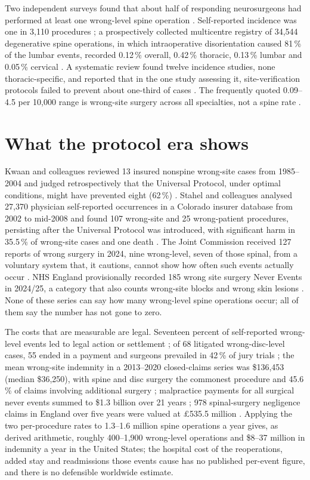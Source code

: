\documentclass[11pt,letterpaper]{article}
\begin{document}
Two independent surveys found that about half of responding neurosurgeons had performed at least one
wrong-level spine operation \citep{mody2008,groff2013}. Self-reported incidence was one in 3,110
procedures \citep{mody2008}; a prospectively collected multicentre registry of 34,544 degenerative spine
operations, in which intraoperative disorientation caused 81\,\% of the lumbar events, recorded 0.12\,\% overall,
0.42\,\% thoracic, 0.13\,\% lumbar and 0.05\,\% cervical \citep{furuya2026}. A systematic review found
twelve incidence studies, none thoracic-specific, and reported that in the one study assessing it,
site-verification protocols failed to prevent about one-third of cases \citep{longo2012}. The
frequently quoted 0.09--4.5 per 10,000 range is wrong-site surgery across all specialties, not a spine
rate \citep{devine2010}.

\section*{What the protocol era shows}
Kwaan and colleagues reviewed 13 insured nonspine wrong-site cases from 1985--2004 and judged
retrospectively that the Universal Protocol, under optimal conditions, might have prevented eight
(62\,\%) \citep{kwaan2006}. Stahel and colleagues
analysed 27,370 physician self-reported occurrences in a Colorado insurer database from 2002 to mid-2008
and found 107 wrong-site and 25 wrong-patient procedures, persisting after the Universal Protocol was
introduced, with significant harm in 35.5\,\% of wrong-site cases and one death \citep{stahel2010}. The Joint Commission received 127 reports of wrong surgery in
2024, nine wrong-level, seven of those spinal, from a voluntary system that, it cautions, cannot show
how often such events actually occur \citep{jc2024}. NHS England provisionally recorded 185 wrong site surgery Never Events in
2024/25, a category that also counts wrong-site blocks and wrong skin lesions \citep{nhse2025}. None of these series can say how many wrong-level spine operations occur; all of them
say the number has not gone to zero.

The costs that are measurable are legal. Seventeen percent of self-reported wrong-level events led to
legal action or settlement \citep{mody2008}; of 68 litigated wrong-disc-level cases, 55 ended in a
payment and surgeons prevailed in 42\,\% of jury trials \citep{goodkin2004}; the mean wrong-site
indemnity in a 2013--2020 closed-claims series was \$136,453 (median \$36,250), with spine and disc
surgery the commonest procedure and 45.6\,\% of claims involving additional surgery \citep{tan2023};
malpractice payments for all surgical never events summed to \$1.3 billion over 21 years
\citep{mehtsun2013}; 978 spinal-surgery negligence claims in England over five years were valued at
\pounds535.5 million \citep{machin2018}. Applying the two per-procedure rates to 1.3--1.6 million spine
operations a year gives, as derived arithmetic, roughly 400--1,900 wrong-level operations and \$8--37
million in indemnity a year in the United States; the hospital cost of the reoperations, added stay and
readmissions those events cause has no published per-event figure, and there is no defensible worldwide
estimate.
\end{document}
